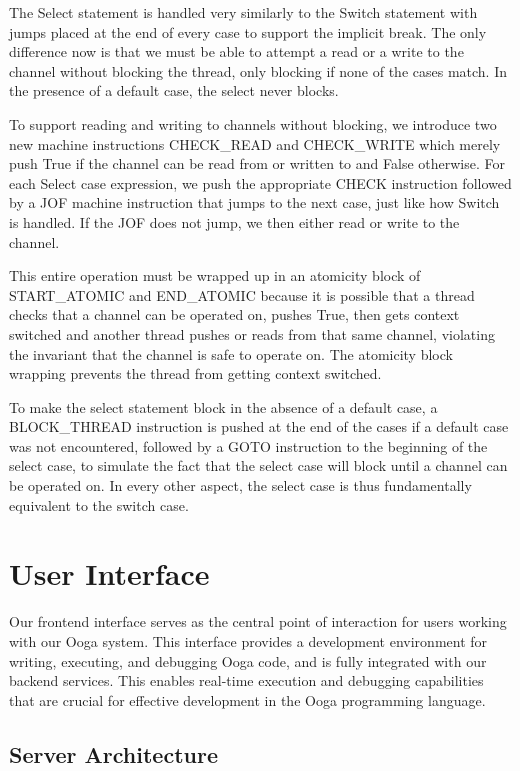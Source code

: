 \documentclass{report}
\begin{document}
The Select statement is handled very similarly to the Switch statement with jumps placed at the end of every case to support the implicit break. The only difference now is that we must be able to attempt a read or a write to the channel without blocking the thread, only blocking if none of the cases match. In the presence of a default case, the select never blocks.

To support reading and writing to channels without blocking, we introduce two new machine instructions CHECK\_READ and CHECK\_WRITE which merely push True if the channel can be read from or written to and False otherwise. For each Select case expression, we push the appropriate CHECK instruction followed by a JOF machine instruction that jumps to the next case, just like how Switch is handled. If the JOF does not jump, we then either read or write to the channel.

This entire operation must be wrapped up in an atomicity block of START\_ATOMIC and END\_ATOMIC because it is possible that a thread checks that a channel can be operated on, pushes True, then gets context switched and another thread pushes or reads from that same channel, violating the invariant that the channel is safe to operate on. The atomicity block wrapping prevents the thread from getting context switched.

To make the select statement block in the absence of a default case, a BLOCK\_THREAD instruction is pushed at the end of the cases if a default case was not encountered, followed by a GOTO instruction to the beginning of the select case, to simulate the fact that the select case will block until a channel can be operated on. In every other aspect, the select case is thus fundamentally equivalent to the switch case.

\section{User Interface}

Our frontend interface serves as the central point of interaction for users working with our Ooga system. This interface provides a development environment for writing, executing, and debugging Ooga code, and is fully integrated with our backend services. This enables real-time execution and debugging capabilities that are crucial for effective development in the Ooga programming language.

\subsection{Server Architecture}
\end{document}
